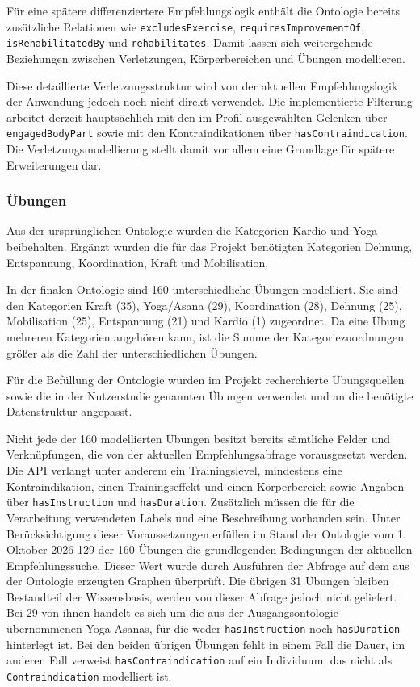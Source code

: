 Für eine spätere differenziertere Empfehlungslogik enthält die Ontologie bereits zusätzliche Relationen wie \texttt{excludesExercise}, \texttt{requiresImprovementOf}, \texttt{isRehabilitatedBy} und \texttt{rehabilitates}. Damit lassen sich weitergehende Beziehungen zwischen Verletzungen, Körperbereichen und Übungen modellieren.

Diese detaillierte Verletzungsstruktur wird von der aktuellen Empfehlungslogik der Anwendung jedoch noch nicht direkt verwendet. Die implementierte Filterung arbeitet derzeit hauptsächlich mit den im Profil ausgewählten Gelenken über \texttt{engagedBodyPart} sowie mit den Kontraindikationen über \texttt{hasContraindication}. Die Verletzungsmodellierung stellt damit vor allem eine Grundlage für spätere Erweiterungen dar.

\subsubsection{Übungen}
\label{sec:ontologie-uebungen}

Aus der ursprünglichen Ontologie wurden die Kategorien Kardio und Yoga beibehalten. Ergänzt wurden die für das Projekt benötigten Kategorien Dehnung, Entspannung, Koordination, Kraft und Mobilisation.

In der finalen Ontologie sind 160 unterschiedliche Übungen modelliert. Sie sind den Kategorien Kraft (35), Yoga/Asana (29), Koordination (28), Dehnung (25), Mobilisation (25), Entspannung (21) und Kardio (1) zugeordnet. Da eine Übung mehreren Kategorien angehören kann, ist die Summe der Kategoriezuordnungen größer als die Zahl der unterschiedlichen Übungen.


Für die Befüllung der Ontologie wurden im Projekt recherchierte Übungsquellen sowie die in der Nutzerstudie genannten Übungen verwendet und an die benötigte Datenstruktur angepasst.

Nicht jede der 160 modellierten Übungen besitzt bereits sämtliche Felder und Verknüpfungen, die von der aktuellen Empfehlungsabfrage vorausgesetzt werden. Die API verlangt unter anderem ein Trainingslevel, mindestens eine Kontraindikation, einen Trainingseffekt und einen Körperbereich sowie Angaben über \texttt{hasInstruction} und \texttt{hasDuration}. Zusätzlich müssen die für die Verarbeitung verwendeten Labels und eine Beschreibung vorhanden sein. Unter Berücksichtigung dieser Voraussetzungen erfüllen im Stand der Ontologie vom 1.\,Oktober 2026 129 der 160 Übungen die grundlegenden Bedingungen der aktuellen Empfehlungssuche. Dieser Wert wurde durch Ausführen der Abfrage auf dem aus der Ontologie erzeugten Graphen überprüft. Die übrigen 31 Übungen bleiben Bestandteil der Wissensbasis, werden von dieser Abfrage jedoch nicht geliefert. Bei 29 von ihnen handelt es sich um die aus der Ausgangsontologie übernommenen Yoga-Asanas, für die weder \texttt{hasInstruction} noch \texttt{hasDuration} hinterlegt ist. Bei den beiden übrigen Übungen fehlt in einem Fall die Dauer, im anderen Fall verweist \texttt{hasContraindication} auf ein Individuum, das nicht als \texttt{Contraindication} modelliert ist.

